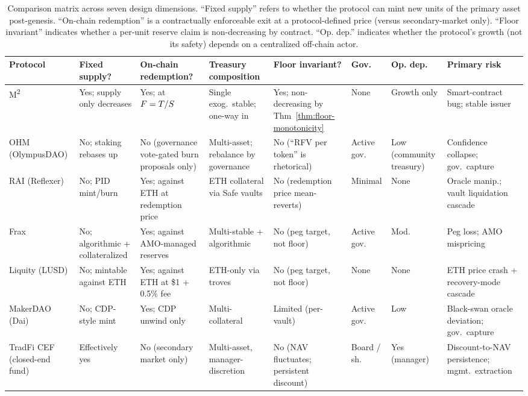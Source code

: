 \begin{table}[t]
\centering
\scriptsize
\caption{Comparison matrix across seven design dimensions. ``Fixed supply'' refers to whether the protocol can mint new units of the primary asset post-genesis. ``On-chain redemption'' is a contractually enforceable exit at a protocol-defined price (versus secondary-market only). ``Floor invariant'' indicates whether a per-unit reserve claim is non-decreasing by contract. ``Op. dep.'' indicates whether the protocol's growth (not its safety) depends on a centralized off-chain actor.}
\label{tab:protocol-comparison}
\renewcommand{\arraystretch}{1.18}
\begin{tabular}{p{1.5cm} p{1.25cm} p{1.55cm} p{1.4cm} p{1.5cm} p{1.4cm} p{1.0cm} p{1.85cm}}
\toprule
\textbf{Protocol} & \textbf{Fixed supply?} & \textbf{On-chain redemption?} & \textbf{Treasury composition} & \textbf{Floor invariant?} & \textbf{Gov.} & \textbf{Op. dep.} & \textbf{Primary risk} \\
\midrule
M\textsuperscript{2} & Yes; supply only decreases & Yes; at $F = T/S$ & Single exog.\ stable; one-way in & Yes; non-decreasing by Thm~\ref{thm:floor-monotonicity} & None & Growth only & Smart-contract bug; stable issuer \\
OHM (OlympusDAO) & No; staking rebases up & No (governance vote-gated burn proposals only) & Multi-asset; rebalance by governance & No (``RFV per token'' is rhetorical) & Active gov. & Low (community treasury) & Confidence collapse; gov.\ capture \\
RAI (Reflexer) & No; PID mint/burn & Yes; against ETH at redemption price & ETH collateral via Safe vaults & No (redemption price mean-reverts) & Minimal & None & Oracle manip.; vault liquidation cascade \\
Frax & No; algorithmic + collateralized & Yes; against AMO-managed reserves & Multi-stable + algorithmic & No (peg target, not floor) & Active gov. & Mod. & Peg loss; AMO mispricing \\
Liquity (LUSD) & No; mintable against ETH & Yes; against ETH at \$1 + 0.5\% fee & ETH-only via troves & No (peg target, not floor) & None & None & ETH price crash + recovery-mode cascade \\
MakerDAO (Dai) & No; CDP-style mint & Yes; CDP unwind only & Multi-collateral & Limited (per-vault) & Active gov. & Low & Black-swan oracle deviation; gov.\ capture \\
\midrule
TradFi CEF (closed-end fund) & Effectively yes & No (secondary market only) & Multi-asset, manager-discretion & No (NAV fluctuates; persistent discount) & Board / sh. & Yes (manager) & Discount-to-NAV persistence; mgmt.\ extraction \\
\bottomrule
\end{tabular}
\end{table}

